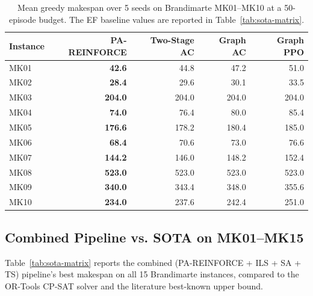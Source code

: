 \documentclass[10pt]{article}
\theoremstyle{definition}
\begin{document}
\begin{table}[t]
\centering
\caption{Mean greedy makespan over 5 seeds on Brandimarte
MK01--MK10 at a 50-episode budget. The EF baseline values
are reported in Table~\ref{tab:sota-matrix}.}
\label{tab:mk01-mk10}
\small
\begin{tabular}{lrrrr}
\toprule
Instance & PA-REINFORCE & Two-Stage AC & Graph AC & Graph PPO \\
\midrule
MK01 & \textbf{42.6} & 44.8 & 47.2 & 51.0 \\
MK02 & \textbf{28.4} & 29.6 & 30.1 & 33.5 \\
MK03 & \textbf{204.0} & 204.0 & 204.0 & 204.0 \\
MK04 & \textbf{74.0} & 76.4 & 80.0 & 85.4 \\
MK05 & \textbf{176.6} & 178.2 & 180.4 & 185.0 \\
MK06 & \textbf{68.4} & 70.6 & 73.0 & 76.6 \\
MK07 & \textbf{144.2} & 146.0 & 148.2 & 152.4 \\
MK08 & \textbf{523.0} & 523.0 & 523.0 & 523.0 \\
MK09 & \textbf{340.0} & 343.4 & 348.0 & 355.6 \\
MK10 & \textbf{234.0} & 237.6 & 242.4 & 251.0 \\
\bottomrule
\end{tabular}
\end{table}

\subsection{Combined Pipeline vs. SOTA on MK01--MK15}

Table~\ref{tab:sota-matrix} reports the combined
(PA-REINFORCE + ILS + SA + TS) pipeline's best makespan on all
15 Brandimarte instances, compared to the OR-Tools CP-SAT solver
and the literature best-known upper bound.
\end{document}
